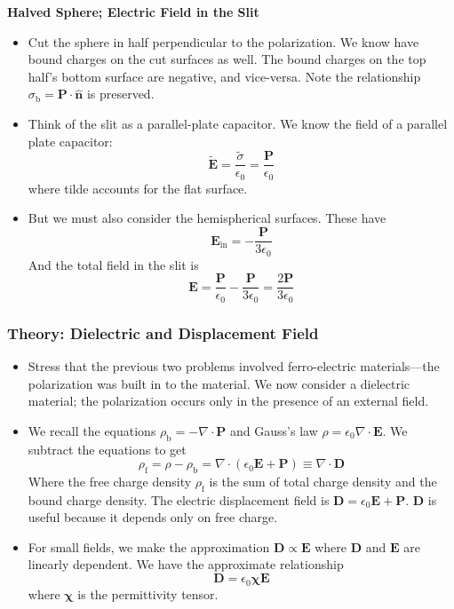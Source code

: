 \documentclass[11pt, a4paper]{article}
\renewcommand{\vec}[1]{\bm{#1}} %
\newcommand{\uvec}[1]{\hat{\vec{#1}}} %
\renewcommand{\t}[1]{\tilde{#1}} %
\newcommand{\E}{\vec{E}}  %
\newcommand{\D}{\vec{D}}  %
\newcommand{\ee}{\epsilon_{0}}  %
\newcommand{\eee}{\bm{\chi}}  %
\renewcommand{\P}{\vec{P}}  %
\renewcommand{\div}{\nabla \cdot}
\begin{document}
\textbf{Halved Sphere; Electric Field in the Slit}
\begin{itemize}
	\item Cut the sphere in half perpendicular to the polarization. We know have bound charges on the cut surfaces as well. The bound charges on the top half's bottom surface are negative, and vice-versa. Note the relationship $ \sigma_{\text{b}} = \P \cdot \uvec{n} $ is preserved. 
	
	\item Think of the slit as a parallel-plate capacitor. We know the field of a parallel plate capacitor:
	\begin{equation*}
		\t{\E} = \frac{\t{\sigma}}{\ee} = \frac{\P}{\ee}
	\end{equation*}
	where tilde accounts for the flat surface. 
	
	\item But we must also consider the hemispherical surfaces. These have
	\begin{equation*}
		\E_{\text{in}} = - \frac{\P}{3\ee}
	\end{equation*}
	And the total field in the slit is
	\begin{equation*}
		\E = \frac{\P}{\ee} - \frac{\P}{3\ee} = \frac{2\P}{3\ee}
	\end{equation*}
\end{itemize}


\subsubsection{Theory: Dielectric and Displacement Field}
\begin{itemize}
		\item Stress that the previous two problems involved ferro-electric materials---the polarization was built in to the material. We now consider a dielectric material; the polarization occurs only in the presence of an external field. 
		
		\item We recall the equations $ \rho_{\text{b}} = - \div \P $ and Gauss's law $ \rho = \ee \div \E $. We subtract the equations to get
		\begin{equation*}
			\rho_{\text{f}} = \rho - \rho_{\text{b}} = \div (\ee \E + \P) \equiv \div \D
		\end{equation*}
		Where the free charge density $ \rho_{\text{f}} $ is the sum of total charge density and the bound charge density. The electric displacement field is $ \D = \ee \E + \P $. $ \D $ is useful because it depends only on free charge. 
		
		\item For small fields, we make the approximation $ \D \propto \E $ where $ \D $ and $ \E $ are linearly dependent. We have the approximate relationship 
		\begin{equation*}
			\D = \ee \eee \E
		\end{equation*}
		where $ \eee $ is the permittivity tensor.
\end{itemize}
\end{document}
